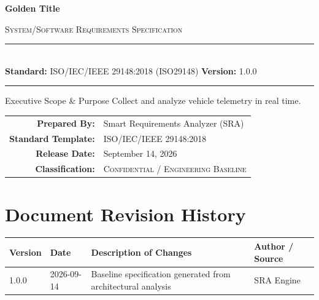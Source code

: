 \documentclass[11pt,a4paper]{article}
\begin{document}
\begin{titlepage}
    \centering
    \vspace*{1.5cm}
    {\Huge\bfseries\sffamily\textcolor{sraprimary}{Golden Title} \par}
    \vspace{0.6cm}
    {\Large\textsc{\textcolor{sraaccent}{System/Software Requirements Specification}} \par}
    \vspace{1.2cm}
    {\color{slateborder}\rule{\linewidth}{1.2pt}}\\[0.4cm]
    {\large \textbf{Standard:} ISO/IEC/IEEE 29148:2018 (ISO29148) \quad \textbf{Version:} 1.0.0}\\[0.2cm]
    {\color{slateborder}\rule{\linewidth}{1.2pt}}
    \vspace{1.8cm}

    \begin{infobox}{Executive Scope \& Purpose}
        Collect and analyze vehicle telemetry in real time.
    \end{infobox}

    \vfill
    \begin{tabularx}{0.85\linewidth}{rX}
        \textbf{Prepared By:} & Smart Requirements Analyzer (SRA) \\
        \textbf{Standard Template:} & ISO/IEC/IEEE 29148:2018 \\
        \textbf{Release Date:} & September 14, 2026 \\
        \textbf{Classification:} & \textsc{Confidential / Engineering Baseline} \\
    \end{tabularx}
    \vspace{1cm}
\end{titlepage}

\tableofcontents
\newpage

\section*{Document Revision History}
\begin{table}[h!]
\centering
\begin{tabularx}{\linewidth}{l l X l}
\toprule
\textbf{Version} & \textbf{Date} & \textbf{Description of Changes} & \textbf{Author / Source} \\
\midrule
1.0.0 & 2026-09-14 & Baseline specification generated from architectural analysis & SRA Engine \\
\bottomrule
\end{tabularx}
\end{table}
\vspace{1cm}
\end{document}
